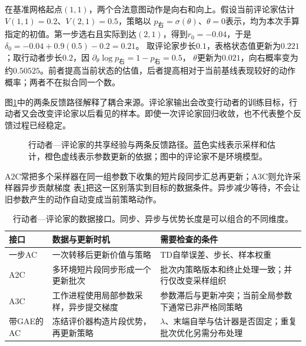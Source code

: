 \begin{example}[同一经验的两种更新]
  \label{ex:rl-learning-actor-critic}
  在基准网格起点$(1,1)$，两个合法意图动作是向右和向上。假设当前评论家估计
  $V(1,1)=0.2$、$V(2,1)=0.5$，策略以
  $p_{\text{右}}=\sigma(\theta)$、$\theta=0$表示，均为本次手算指定的初值。第一步选右且实际到达$(2,1)$，得到$r_0=-0.04$，于是
  $\delta_0=-0.04+0.9(0.5)-0.2=0.21$。
  取评论家步长$0.1$，表格状态值更新为$0.221$；取行动者步长$0.2$，因
  $\partial_\theta\log p_{\text{右}}=1-p_{\text{右}}=0.5$，
  $\theta$更新为$0.021$，向右概率变为约$0.50525$。前者提高当前状态的估值，后者提高相对于当前基线表现较好的动作概率；两者不在拟合同一个数。
\end{example}

图\ref{fig:rl-learning-actor-critic}中的两条反馈路径解释了耦合来源。评论家输出会改变行动者的训练目标，行动者又会改变评论家以后看见的样本。即使一次评论家回归收敛，也不代表整个反馈过程已经稳定。

\begin{figure}[t]
  \centering
  
  \caption{行动者—评论家的共享经验与两条反馈路径。蓝色实线表示采样和估计，橙色虚线表示参数更新的依据；图中的评论家不是环境模型。}
  \label{fig:rl-learning-actor-critic}
\end{figure}

A2C常把多个采样器在同一组参数下收集的短片段同步汇总再更新；A3C则允许采样器异步贡献梯度
表\ref{tab:rl-learning-ac-interfaces}把这一区别落实到目标的数据条件。异步减少等待，不会让旧参数产生的动作自动变成当前策略动作。

\begin{table}[t]
  \centering
  \small
  \begin{tabularx}{\linewidth}{>{\raggedright\arraybackslash}p{21mm} >{\raggedright\arraybackslash}X >{\raggedright\arraybackslash}X}
    \toprule
    接口 & 数据与更新时机 & 需要检查的条件 \\
    \midrule
    一步AC & 一次转移后更新价值与策略 & TD自举误差、步长、样本权重 \\
    A2C & 多环境短片段同步形成一个更新批次 & 批次内策略版本和终止处理一致；并行仅改变采样组织 \\
    A3C & 工作进程使用局部参数采样，异步提交梯度 & 参数滞后与更新冲突；当前全局参数下通常已非严格同策略 \\
    带GAE的AC & 冻结评价器构造片段优势，再更新策略 & $\lambda$、末端自举与估计器是否固定；重复批次优化另需分布处理 \\
    \bottomrule
  \end{tabularx}
  \caption{行动者—评论家的数据接口。同步、异步与优势长度是可以组合的不同维度。}
  \label{tab:rl-learning-ac-interfaces}
\end{table}

